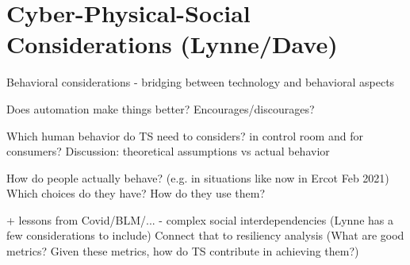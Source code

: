 \chapter{Cyber-Physical-Social Considerations (Lynne/Dave)}

Behavioral considerations - bridging between technology and behavioral aspects

Does automation  make things better? Encourages/discourages?

Which human behavior do TS need to considers? in control room and for consumers? Discussion: theoretical assumptions vs actual behavior

How do people actually behave? (e.g. in situations like now in Ercot Feb 2021) Which choices do they have? How do they use them?

+ lessons from Covid/BLM/... - complex social interdependencies (Lynne has a few considerations to include)
Connect that to resiliency analysis (What are good metrics? Given these metrics, how do TS contribute in achieving them?)